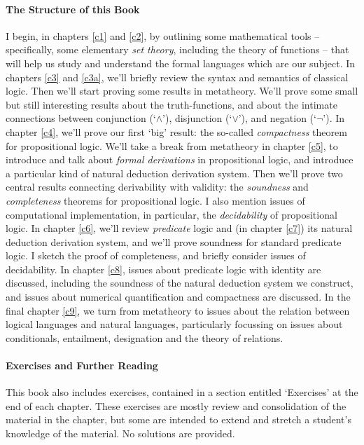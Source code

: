 \documentclass[openany,leqno,11pt]{book}
\theoremstyle{break}
\theoremstyle{definition}
\theoremstyle{remark}
\begin{document}
\paragraph{The Structure of this Book} I begin, in chapters \ref{c1} and \ref{c2}, by outlining some mathematical tools – specifically, some elementary \emph{set theory}, including the theory of functions – that will help us study and understand the formal languages which are our subject. In chapters \ref{c3} and \ref{c3a}, we'll briefly review the syntax and semantics of classical logic. Then we'll start proving some results in metatheory. We'll prove some small but still interesting results about the truth-functions, and about the intimate connections between conjunction (‘$\wedge$’), disjunction (‘$\vee$’), and negation (‘$¬$’). In chapter \ref{c4}, we'll prove our first `big' result: the so-called \emph{compactness} theorem for propositional logic. We'll take a break from metatheory in chapter \ref{c5}, to introduce and talk about \emph{formal derivations} in propositional logic, and introduce a particular kind of natural deduction derivation system. Then we'll prove two central results connecting derivability with validity: the \emph{soundness} and \emph{completeness} theorems for propositional logic. I also mention issues of computational implementation, in particular, the \emph{decidability} of propositional logic.
In chapter \ref{c6}, we'll review \emph{predicate} logic and (in chapter \ref{c7}) its natural deduction derivation system, and we'll prove soundness for standard predicate logic. I sketch the proof of completeness, and briefly consider issues of decidability. In chapter \ref{c8}, issues about predicate logic with identity are discussed, including the soundness of the natural deduction system we construct, and issues about numerical quantification and compactness are discussed. In the final chapter \ref{c9}, we turn from metatheory to issues about the relation between logical languages and natural languages, particularly focussing on issues about conditionals, entailment, designation and the theory of relations.

\paragraph{Exercises and Further Reading} This book also includes exercises, contained in a section entitled `Exercises' at the end of each chapter. These exercises are mostly review and consolidation of the material in the chapter, but some are intended to extend and stretch a student's knowledge of the material. No solutions are provided.
\end{document}
